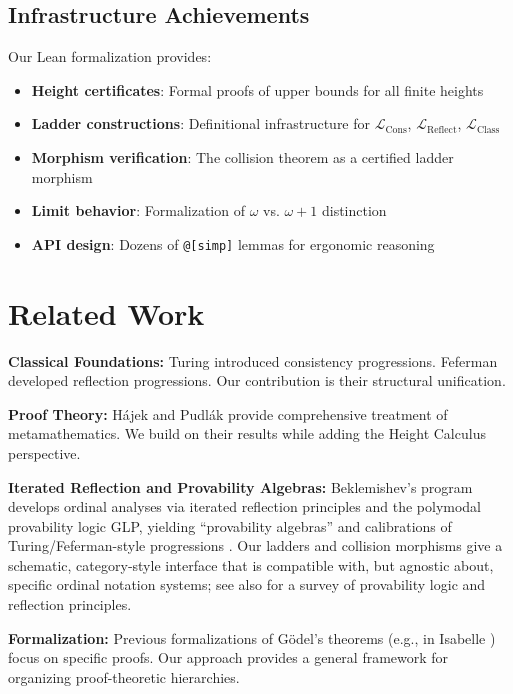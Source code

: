 \documentclass[11pt]{article}
\newcommand{\LCons}{\mathcal{L}_{\mathrm{Cons}}}
\newcommand{\LReflect}{\mathcal{L}_{\mathrm{Reflect}}}
\newcommand{\LClass}{\mathcal{L}_{\mathrm{Class}}}
\begin{document}
\subsection{Infrastructure Achievements}
Our Lean formalization provides:
\begin{itemize}
\item \textbf{Height certificates}: Formal proofs of upper bounds for all finite heights
\item \textbf{Ladder constructions}: Definitional infrastructure for $\LCons$, $\LReflect$, $\LClass$
\item \textbf{Morphism verification}: The collision theorem as a certified ladder morphism
\item \textbf{Limit behavior}: Formalization of $\omega$ vs. $\omega+1$ distinction
\item \textbf{API design}: Dozens of \texttt{@[simp]} lemmas for ergonomic reasoning
\end{itemize}

\section{Related Work}

\textbf{Classical Foundations:} Turing \cite{Turing1939} introduced consistency progressions. Feferman \cite{Feferman1962} developed reflection progressions. Our contribution is their structural unification.

\textbf{Proof Theory:} Hájek and Pudlák \cite{HajekPudlak} provide comprehensive treatment of metamathematics. We build on their results while adding the Height Calculus perspective.

\textbf{Iterated Reflection and Provability Algebras:} Beklemishev’s program develops ordinal analyses via iterated reflection principles and the polymodal provability logic GLP, yielding “provability algebras” and calibrations of Turing/Feferman-style progressions \cite{Beklemishev2003,Beklemishev2004}. Our ladders and collision morphisms give a schematic, category‑style interface that is compatible with, but agnostic about, specific ordinal notation systems; see also \cite{ArtemovBeklemishev2004} for a survey of provability logic and reflection principles.

\textbf{Formalization:} Previous formalizations of Gödel's theorems (e.g., in Isabelle \cite{Paulson}) focus on specific proofs. Our approach provides a general framework for organizing proof-theoretic hierarchies.
\end{document}
